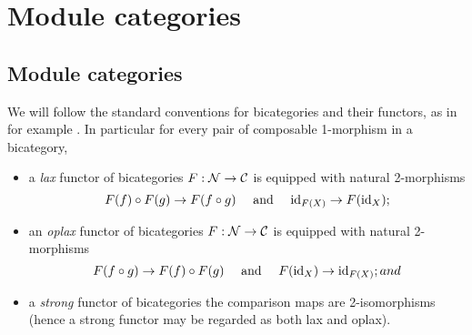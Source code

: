 \documentclass{amsart}
\begin{document}


\section{Module categories} \label{sec:tc-bimod}

\subsection{Module categories} %

We will follow the standard conventions for bicategories and their functors, as in for example \cite{MR2664622}. In particular for every pair of composable 1-morphism in a bicategory, 
\begin{itemize}
	\item a {\em lax} functor of bicategories $F: \mathcal N \to \mathcal C$ is equipped with natural 2-morphisms
	\begin{equation*}
		F(f) \circ F(g) \to F(f \circ g) \quad \textrm{ and } \quad \mathrm{id}_{F(X)} \to F(\mathrm{id}_X);
	\end{equation*} 
	\item an {\em oplax} functor of bicategories $F: \mathcal N \to \mathcal C$ is equipped with natural 2-morphisms
	\begin{equation*}
		F(f \circ g) \to F(f) \circ F(g)   \quad \textrm{ and } \quad F(\mathrm{id}_X) \to \mathrm{id}_{F(X)}; and
	\end{equation*}
	\item a {\em strong} functor of bicategories the comparison maps are 2-isomorphisms (hence a strong functor may be regarded as both lax and oplax). 
\end{itemize}
\end{document}
